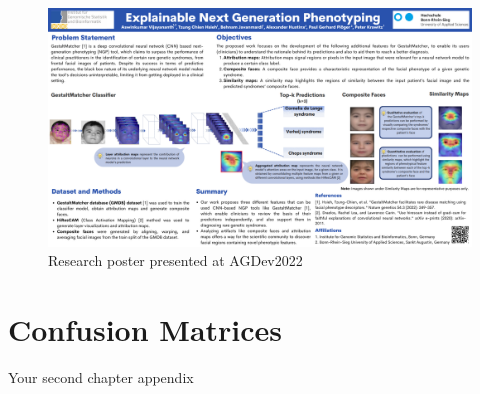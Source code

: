 \documentclass[../report.tex]{subfiles}
\begin{document}
\begin{itemize}
\begin{figure}
    	\includegraphics[scale=0.4]{images/poster_1.pdf}
    	\caption{Research poster presented at AGDev2022}
      \end{figure}
	\end{itemize}
    \chapter{Confusion Matrices}
    Your second chapter appendix
\end{document}
